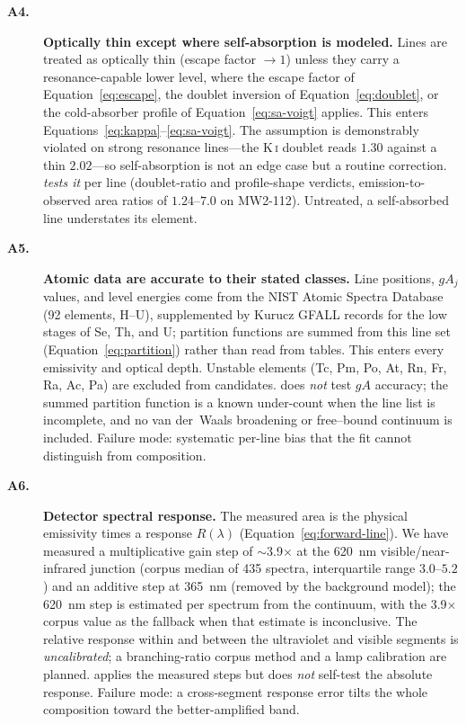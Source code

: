\begin{description}
\item[\textbf{A4.}] \textbf{Optically thin except where self-absorption is modeled.}
Lines are treated as optically thin (escape factor $\rightarrow 1$) unless they carry
a resonance-capable lower level, where the escape factor of
Equation~\eqref{eq:escape}, the doublet inversion of Equation~\eqref{eq:doublet}, or
the cold-absorber profile of Equation~\eqref{eq:sa-voigt} applies. This enters
Equations~\eqref{eq:kappa}--\eqref{eq:sa-voigt}. The assumption is demonstrably
violated on strong resonance lines---the \mbox{K\,\textsc{i}} doublet reads $1.30$
against a thin $2.02$---so self-absorption is not an edge case but a routine
correction. \alibz{} \emph{tests it} per line (doublet-ratio and profile-shape
verdicts, emission-to-observed area ratios of $1.24$--$7.0$ on MW2-112). Untreated, a
self-absorbed line understates its element.

\item[\textbf{A5.}] \textbf{Atomic data are accurate to their stated classes.}
Line positions, $gA_j$ values, and level energies come from the NIST Atomic Spectra
Database \citep{kramida2023asd,ralchenko2020nist} (92 elements, H--U), supplemented by
Kurucz GFALL records \citep{kurucz2011lines} for the low stages of Se, Th, and U; partition functions are summed from this line set
(Equation~\eqref{eq:partition}) rather than read from tables. This enters every
emissivity and optical depth. Unstable elements (Tc, Pm, Po, At, Rn, Fr, Ra, Ac, Pa)
are excluded from candidates. \alibz{} does \emph{not} test $gA$ accuracy; the summed
partition function is a known under-count when the line list is incomplete, and no van
der~Waals broadening or free--bound continuum is included. Failure mode: systematic
per-line bias that the fit cannot distinguish from composition.

\item[\textbf{A6.}] \textbf{Detector spectral response.}
The measured area is the physical emissivity times a response $R(\lambda)$
(Equation~\eqref{eq:forward-line}). We have measured a multiplicative gain step of
$\sim$\num{3.9}$\times$ at the \SI{620}{\nano\meter} visible/near-infrared junction
(corpus median of 435 spectra, interquartile range $3.0$--$5.2$) and an additive step
at \SI{365}{\nano\meter} (removed by the background model); the \SI{620}{\nano\meter}
step is estimated per spectrum from the continuum, with the \num{3.9}$\times$ corpus
value as the fallback when that estimate is inconclusive. The relative response within
and between the ultraviolet and visible segments is \emph{uncalibrated}; a
branching-ratio corpus method and a lamp calibration are planned. \alibz{} applies the
measured steps but does \emph{not} self-test the absolute response. Failure mode: a
cross-segment response error tilts the whole composition toward the better-amplified
band.


\end{description}
